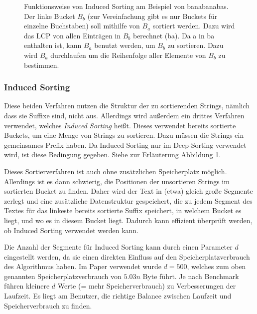 \begin{figure}
\caption[Funktionsweise von Induced Sorting]{Funktionsweise von Induced Sorting am Beispiel von \glqq banabanabas\grqq. Der linke Bucket $B_b$ (zur Vereinfachung gibt es nur Buckets für einzelne Buchstaben) soll mithilfe von $B_a$ sortiert werden. Dazu wird das LCP von allen Einträgen in $B_b$ berechnet (\glqq ba\grqq). Da \glqq a\grqq{} in \glqq ba\grqq{} enthalten ist, kann $B_a$ benutzt werden, um $B_b$ zu sortieren. Dazu wird $B_a$ durchlaufen um die Reihenfolge aller Elemente von $B_b$ zu bestimmen.}
\label{fg:induced}
\end{figure}

\subsubsection{Induced Sorting}

Diese beiden Verfahren nutzen die Struktur der zu sortierenden Strings, nämlich dass sie Suffixe sind, nicht aus.
Allerdings wird außerdem ein drittes Verfahren verwendet, welches \textit{Induced Sorting} heißt.
Dieses verwendet bereits sortierte Buckets, um eine Menge von Strings zu sortieren.
Dazu müssen die Strings ein gemeinsames Prefix haben.
Da Induced Sorting nur im Deep-Sorting verwendet wird, ist diese Bedingung gegeben.
Siehe zur Erläuterung Abbildung \ref{fg:induced}.

Dieses Sortierverfahren ist auch ohne zusätzlichen Speicherplatz möglich.
Allerdings ist es dann schwierig, die Positionen der unsortieren Strings im sortierten Bucket zu finden.
Daher wird der Text in (etwa) gleich große Segmente zerlegt und eine zusätzliche Datenstruktur gespeichert,
die zu jedem Segment des Textes für das linkeste bereits sortierte Suffix speichert,
in welchem Bucket es liegt, und wo es in diesem Bucket liegt.
Dadurch kann effizient überprüft werden, ob Induced Sorting verwendet werden kann.

Die Anzahl der Segmente für Induced Sorting kann durch einen Parameter $d$ eingestellt werden,
da sie einen direkten Einfluss auf den Speicherplatzverbrauch des Algorithmus haben.
Im Paper verwendet wurde $d = 500$, welches zum oben genannten Speicherplatzverbrauch von $5.03n$ Byte führt.
Je nach Benchmark führen kleinere $d$ Werte (= mehr Speicherverbrauch) zu Verbesserungen der Laufzeit.
Es liegt am Benutzer, die richtige Balance zwischen Laufzeit und Speicherverbrauch zu finden.


